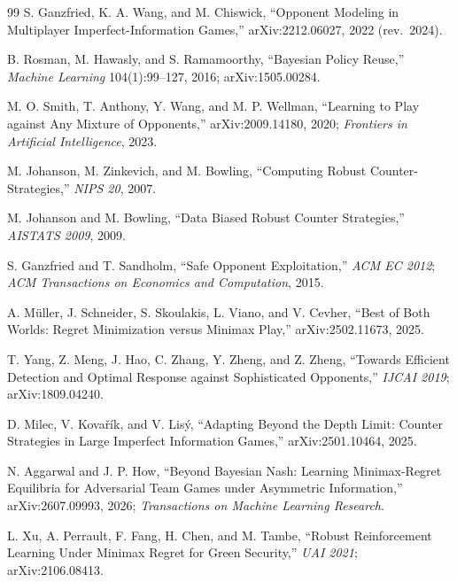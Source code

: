 \begin{thebibliography}{99}
S. Ganzfried, K. A. Wang, and M. Chiswick, ``Opponent Modeling in Multiplayer
Imperfect-Information Games,'' arXiv:2212.06027, 2022 (rev.\ 2024).

B. Rosman, M. Hawasly, and S. Ramamoorthy, ``Bayesian Policy Reuse,''
\emph{Machine Learning} 104(1):99--127, 2016; arXiv:1505.00284.

M. O. Smith, T. Anthony, Y. Wang, and M. P. Wellman, ``Learning to Play against
Any Mixture of Opponents,'' arXiv:2009.14180, 2020; \emph{Frontiers in Artificial
Intelligence}, 2023.

M. Johanson, M. Zinkevich, and M. Bowling, ``Computing Robust
Counter-Strategies,'' \emph{NIPS 20}, 2007.

M. Johanson and M. Bowling, ``Data Biased Robust Counter Strategies,''
\emph{AISTATS 2009}, 2009.

S. Ganzfried and T. Sandholm, ``Safe Opponent Exploitation,'' \emph{ACM EC 2012};
\emph{ACM Transactions on Economics and Computation}, 2015.

A. M\"uller, J. Schneider, S. Skoulakis, L. Viano, and V. Cevher, ``Best of Both
Worlds: Regret Minimization versus Minimax Play,'' arXiv:2502.11673, 2025.

T. Yang, Z. Meng, J. Hao, C. Zhang, Y. Zheng, and Z. Zheng, ``Towards Efficient
Detection and Optimal Response against Sophisticated Opponents,'' \emph{IJCAI
2019}; arXiv:1809.04240.

D. Milec, V. Kova\v{r}\'ik, and V. Lis\'y, ``Adapting Beyond the Depth Limit:
Counter Strategies in Large Imperfect Information Games,'' arXiv:2501.10464,
2025.


N. Aggarwal and J. P. How, ``Beyond Bayesian Nash: Learning Minimax-Regret
Equilibria for Adversarial Team Games under Asymmetric Information,''
arXiv:2607.09993, 2026; \emph{Transactions on Machine Learning Research}.

L. Xu, A. Perrault, F. Fang, H. Chen, and M. Tambe, ``Robust Reinforcement
Learning Under Minimax Regret for Green Security,'' \emph{UAI 2021};
arXiv:2106.08413.


\end{thebibliography}
